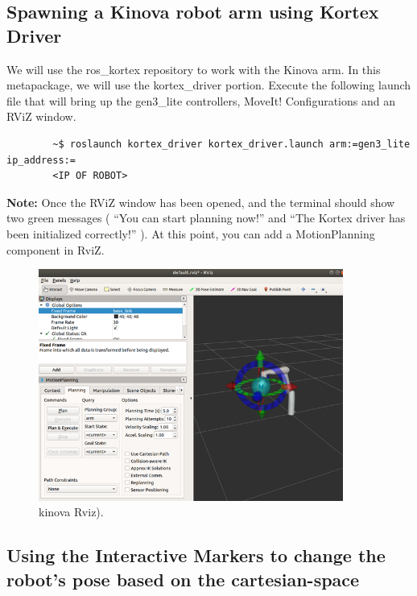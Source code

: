 \documentclass[12pt]{article}
\begin{document}
\begin{enumerate}
\begin{enumerate}
    \end{enumerate}
\end{enumerate}




\subsection{Spawning a Kinova robot arm using Kortex Driver}

We will use the ros\_kortex repository to work with the Kinova arm. In this metapackage, we will use the kortex\_driver portion. Execute the following launch file that will bring up the gen3\_lite controllers, MoveIt! Configurations and an RViZ window.

\begin{verbatim}
        ~$ roslaunch kortex_driver kortex_driver.launch arm:=gen3_lite ip_address:=
        <IP OF ROBOT>
    \end{verbatim}

\textbf{Note:} Once the RViZ window has been opened, and the terminal should show two green messages ( “You can start planning now!” and “The Kortex driver has been initialized correctly!” ). At this point, you can add a MotionPlanning component in RviZ.


\begin{figure}[H]
    \vspace{-10pt}
    \centering\includegraphics[width=10cm]{images/kinovaRviz.PNG}\vspace{-10pt}
    \caption{kinova Rviz).}\label{fig:kinovarviz}
    \end{figure}

\subsection{Using the Interactive Markers to change the robot’s pose based on the cartesian-space}
\end{document}
